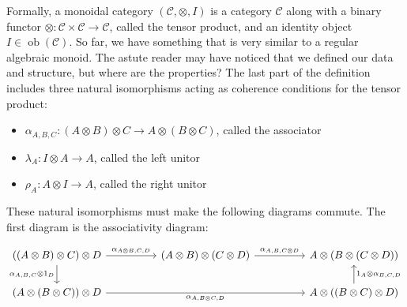 \documentclass{article}
\begin{document}
Formally, a monoidal category $(\mathcal{C}, \otimes, I)$ is a category
$\mathcal{C}$ along with a binary functor $\otimes : \mathcal{C} \times
\mathcal{C} \to \mathcal{C}$, called the tensor product, and an identity object
$I \in \operatorname{ob}(\mathcal{C})$. So far, we have something that is very
similar to a regular algebraic monoid. The astute reader may have noticed that
we defined our data and structure, but where are the properties? The last part
of the definition includes three natural isomorphisms acting as coherence
conditions for the tensor product:

\begin{itemize}
  \item $\alpha_{A, B, C} : (A \otimes B) \otimes C \to A \otimes (B \otimes
    C)$, called the associator
  \item $\lambda_A : I \otimes A \to A$, called the left unitor
  \item $\rho_A : A \otimes I \to A$, called the right unitor
\end{itemize}

These natural isomorphisms must make the following diagrams commute. The first
diagram is the associativity diagram:

\begin{equation*}
  \begin{tikzcd}
    ((A \otimes B) \otimes C) \otimes D \arrow[rr, "{\alpha_{A \otimes B, C, D}}"] \arrow[d, "{\alpha_{A, B, C} \otimes 1_D}"'] &  & (A \otimes B) \otimes (C \otimes D) \arrow[rr, "{\alpha_{A, B, C \otimes D}}"] &  & A \otimes (B \otimes (C \otimes D))                                              \\
    (A \otimes (B \otimes C)) \otimes D \arrow[rrrr, "{\alpha_{A, B \otimes C, D}}"']                                           &  &                                                                                &  & A \otimes ((B \otimes C) \otimes D) \arrow[u, "{1_A \otimes \alpha_{B, C, D}}"']
  \end{tikzcd}
\end{equation*}
\end{document}

